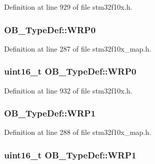 Definition at line 929 of file stm32f10x.\+h.

\subsubsection[{\texorpdfstring{W\+R\+P0}{WRP0}}]{ O\+B\+\_\+\+Type\+Def\+::\+W\+R\+P0}\hypertarget{struct_o_b___type_def_a81296f71933dfb95366cdf72426ac967}{}\label{struct_o_b___type_def_a81296f71933dfb95366cdf72426ac967}


Definition at line 287 of file stm32f10x\+\_\+map.\+h.

\subsubsection[{\texorpdfstring{W\+R\+P0}{WRP0}}]{ {\bf uint16\+\_\+t} O\+B\+\_\+\+Type\+Def\+::\+W\+R\+P0}\hypertarget{struct_o_b___type_def_acee93898f092604a871e52d64560e7a9}{}\label{struct_o_b___type_def_acee93898f092604a871e52d64560e7a9}


Definition at line 932 of file stm32f10x.\+h.

\subsubsection[{\texorpdfstring{W\+R\+P1}{WRP1}}]{ O\+B\+\_\+\+Type\+Def\+::\+W\+R\+P1}\hypertarget{struct_o_b___type_def_a5765cd27fa38cda630a7cb0e91de14fa}{}\label{struct_o_b___type_def_a5765cd27fa38cda630a7cb0e91de14fa}


Definition at line 288 of file stm32f10x\+\_\+map.\+h.

\subsubsection[{\texorpdfstring{W\+R\+P1}{WRP1}}]{ {\bf uint16\+\_\+t} O\+B\+\_\+\+Type\+Def\+::\+W\+R\+P1}\hypertarget{struct_o_b___type_def_ad397993d8c149a64e3f2a8bc7ecdf1c5}{}\label{struct_o_b___type_def_ad397993d8c149a64e3f2a8bc7ecdf1c5}


